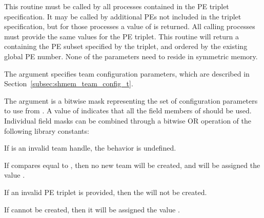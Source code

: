 \begin{apidefinition}
{This routine must be called by all processes contained in the \ac{PE} triplet
specification. It may be called by additional \acp{PE} not included in the
triplet specification, but for those processes a  value of
 is returned. All calling processes must provide the
same values for the \ac{PE} triplet. This routine will return a 
containing the \ac{PE} subset specified by the triplet, and ordered by the
existing global \ac{PE} number. None of the parameters need to reside in
symmetric memory.

The  argument specifies team configuration parameters, which are
described in Section~\ref{subsec:shmem_team_config_t}.

The  argument is a bitwise mask representing the set of
configuration parameters to use from .
A  value of  indicates that all the field members
of  should be used.
Individual field masks can be combined through a bitwise OR operation
of the following library constants:

{
}

If  is an invalid team handle, the behavior is undefined.

If  compares equal to , then no
new team will be created, and   will be assigned the value
.

If an invalid \ac{PE} triplet is provided, then the  will not be created.

If  cannot be created, then it will be assigned the value
.
}



\begin{apiexamples}

\end{apiexamples}

\end{apidefinition}
